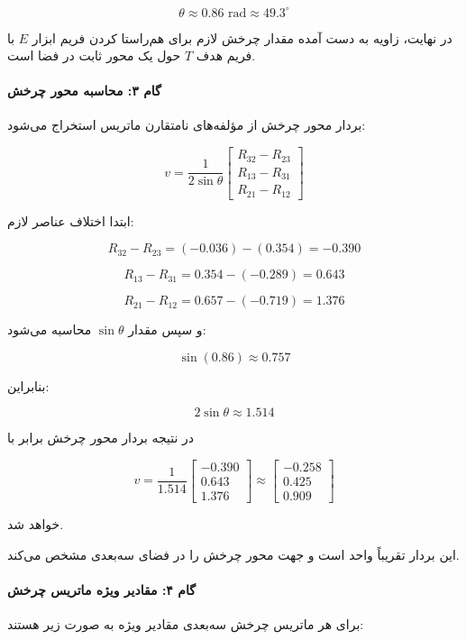 \documentclass{article}
\begin{document}
\[
\theta \approx 0.86 \text{ rad} \approx 49.3^\circ
\]

در نهایت، زاویه به دست آمده مقدار چرخش لازم برای هم‌راستا کردن فریم ابزار \(E\) با فریم هدف \(T\) حول یک محور ثابت در فضا است.

\paragraph{گام ۳: محاسبه محور چرخش}

بردار محور چرخش از مؤلفه‌های نامتقارن ماتریس استخراج می‌شود:

\[
v =
\frac{1}{2\sin\theta}
\begin{bmatrix}
	R_{32}-R_{23}\\
	R_{13}-R_{31}\\
	R_{21}-R_{12}
\end{bmatrix}
\]

ابتدا اختلاف عناصر لازم:

\[
R_{32}-R_{23} =
(-0.036)-(0.354) = -0.390
\]

\[
R_{13}-R_{31} =
0.354-(-0.289) = 0.643
\]

\[
R_{21}-R_{12} =
0.657-(-0.719) = 1.376
\]

و سپس مقدار \( \sin\theta \) محاسبه می‌شود:

\[
\sin(0.86) \approx 0.757
\]

بنابراین:

\[
2\sin\theta \approx 1.514
\]

در نتیجه بردار محور چرخش برابر با

\[
v =
\frac{1}{1.514}
\begin{bmatrix}
	-0.390\\
	0.643\\
	1.376
\end{bmatrix}
\approx
\begin{bmatrix}
	-0.258\\
	0.425\\
	0.909
\end{bmatrix}
\]

خواهد شد.

این بردار تقریباً واحد است و جهت محور چرخش را در فضای سه‌بعدی مشخص می‌کند.

\paragraph{گام ۴: مقادیر ویژه ماتریس چرخش}

برای هر ماتریس چرخش سه‌بعدی مقادیر ویژه به صورت زیر هستند:
\end{document}
